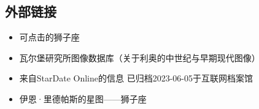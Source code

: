 \subsection{外部链接}
\begin{itemize}
\item 可点击的狮子座
\item 瓦尔堡研究所图像数据库（关于利奥的中世纪与早期现代图像）
\item 来自StarDate Online的信息 已归档2023-06-05于互联网档案馆
\item 伊恩·里德帕斯的星图——狮子座
\end{itemize}